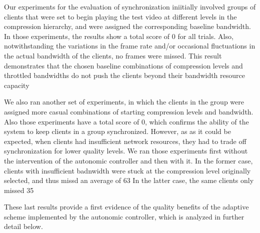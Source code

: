 \documentclass{sig-alternate}
\begin{document}
Our experiments for the evaluation of synchronization iniitially involved groups of clients
that were set to begin playing the test video at different levels in the compression hierarchy, 
and were assigned the corresponding baseline bandwidth. In those experiments, 
the results show a total score of
0 for all trials. Also, notwithstanding the 
variations in the frame rate and/or occasional fluctuations in the actual bandwidth of the clients,
no frames were missed.  
This result demonstrates that the chosen baseline combinations of compression levels
and throttled bandwidths do not push the clients beyond their
bandwidth resource capacity

We also ran another set of experiments, in which the clients in the group were assigned more casual
combinations of starting compression levels and bandwidth. Also those experiments have a total score
of 0, which confirms the ability of the system to keep clients in a group synchronized.
However, as as it could be expected, when clients had insufficient 
network resources, they had to trade off  synchronization for lower quality levels.
We ran those experiments first without the intervention of the autonomic controller and then
with it. In the former case, clients with insufficient badnwidth were stuck at the compression
level originally selected, and thus missd an average of 63%
In the latter case, the same clients only missed 35%

These last results provide a first evidence of the quality benefits of the adaptive scheme
implemented by the autonomic controller, which is analyzed in further detail below. 


\end{document}
